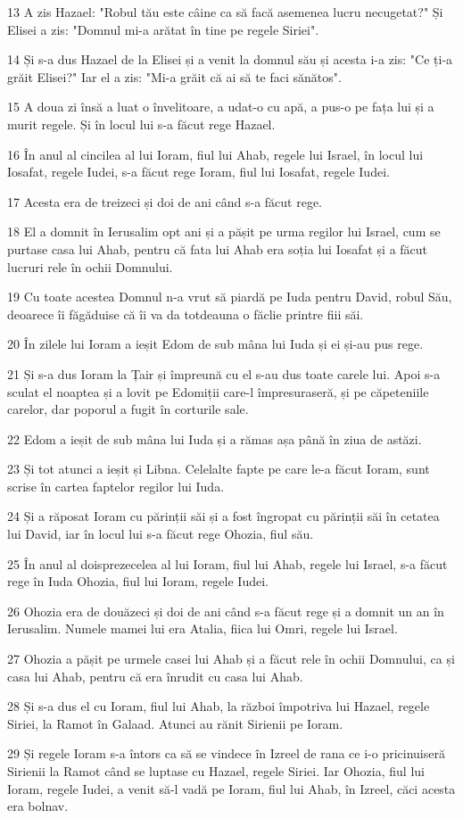 \par 13 A zis Hazael: "Robul tău este câine ca să facă asemenea lucru necugetat?" Și Elisei a zis: "Domnul mi-a arătat în tine pe regele Siriei".
\par 14 Și s-a dus Hazael de la Elisei și a venit la domnul său și acesta i-a zis: "Ce ți-a grăit Elisei?" Iar el a zis: "Mi-a grăit că ai să te faci sănătos".
\par 15 A doua zi însă a luat o învelitoare, a udat-o cu apă, a pus-o pe fața lui și a murit regele. Și în locul lui s-a făcut rege Hazael.
\par 16 În anul al cincilea al lui Ioram, fiul lui Ahab, regele lui Israel, în locul lui Iosafat, regele Iudei, s-a făcut rege Ioram, fiul lui Iosafat, regele Iudei.
\par 17 Acesta era de treizeci și doi de ani când s-a făcut rege.
\par 18 El a domnit în Ierusalim opt ani și a pășit pe urma regilor lui Israel, cum se purtase casa lui Ahab, pentru că fata lui Ahab era soția lui Iosafat și a făcut lucruri rele în ochii Domnului.
\par 19 Cu toate acestea Domnul n-a vrut să piardă pe Iuda pentru David, robul Său, deoarece îi făgăduise că îi va da totdeauna o făclie printre fiii săi.
\par 20 În zilele lui Ioram a ieșit Edom de sub mâna lui Iuda și ei și-au pus rege.
\par 21 Și s-a dus Ioram la Țair și împreună cu el s-au dus toate carele lui. Apoi s-a sculat el noaptea și a lovit pe Edomiții care-l împresuraseră, și pe căpeteniile carelor, dar poporul a fugit în corturile sale.
\par 22 Edom a ieșit de sub mâna lui Iuda și a rămas așa până în ziua de astăzi.
\par 23 Și tot atunci a ieșit și Libna. Celelalte fapte pe care le-a făcut Ioram, sunt scrise în cartea faptelor regilor lui Iuda.
\par 24 Și a răposat Ioram cu părinții săi și a fost îngropat cu părinții săi în cetatea lui David, iar în locul lui s-a făcut rege Ohozia, fiul său.
\par 25 În anul al doisprezecelea al lui Ioram, fiul lui Ahab, regele lui Israel, s-a făcut rege în Iuda Ohozia, fiul lui Ioram, regele Iudei.
\par 26 Ohozia era de douăzeci și doi de ani când s-a făcut rege și a domnit un an în Ierusalim. Numele mamei lui era Atalia, fiica lui Omri, regele lui Israel.
\par 27 Ohozia a pășit pe urmele casei lui Ahab și a făcut rele în ochii Domnului, ca și casa lui Ahab, pentru că era înrudit cu casa lui Ahab.
\par 28 Și s-a dus el cu Ioram, fiul lui Ahab, la război împotriva lui Hazael, regele Siriei, la Ramot în Galaad. Atunci au rănit Sirienii pe Ioram.
\par 29 Și regele Ioram s-a întors ca să se vindece în Izreel de rana ce i-o pricinuiseră Sirienii la Ramot când se luptase cu Hazael, regele Siriei. Iar Ohozia, fiul lui Ioram, regele Iudei, a venit să-l vadă pe Ioram, fiul lui Ahab, în Izreel, căci acesta era bolnav.

